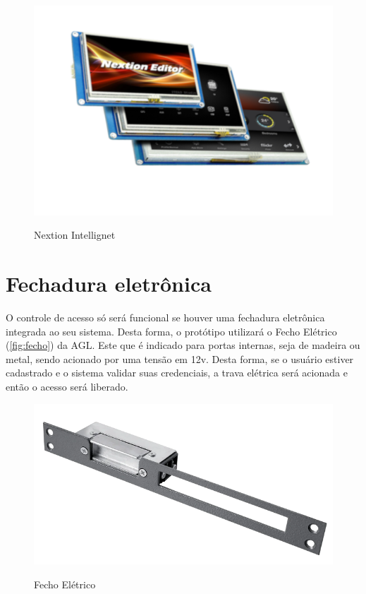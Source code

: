 \begin{figure}[h!]
    \centering
    \caption{Nextion Intellignet}
    \includegraphics[scale=0.3]{figuras/nextion.png} 
    \label{fig:nextion}
    \centering
\end{figure}

\section{Fechadura eletrônica}\label{sec:materiais}

O controle de acesso só será funcional se houver uma fechadura eletrônica 
integrada ao seu sistema. Desta forma, o protótipo utilizará o Fecho Elétrico (\autoref{fig:fecho}) 
da AGL. Este que é indicado para portas internas, seja de madeira ou metal, sendo 
acionado por uma tensão em 12v. Desta forma, se o usuário estiver cadastrado 
e o sistema validar suas credenciais, a trava elétrica será acionada e 
então o acesso será liberado.


\begin{figure}[h!]
    \centering
    \caption{Fecho Elétrico}
    \includegraphics[scale=0.3]{figuras/fechoagl.png} 
    \label{fig:fecho}
    \centering
\end{figure}